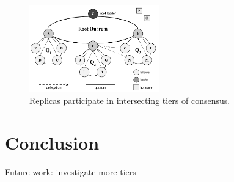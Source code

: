 \documentclass[11pt,conference]{IEEEtran}
\begin{document}


\begin{figure}[t]
    \centering
    \includegraphics[width=0.5\textwidth]{figures/election3}
    \caption{Replicas participate in intersecting tiers of consensus.}
    \label{fig:system}
\end{figure}


\section{Conclusion}



Future work: investigate more tiers



\end{document}
